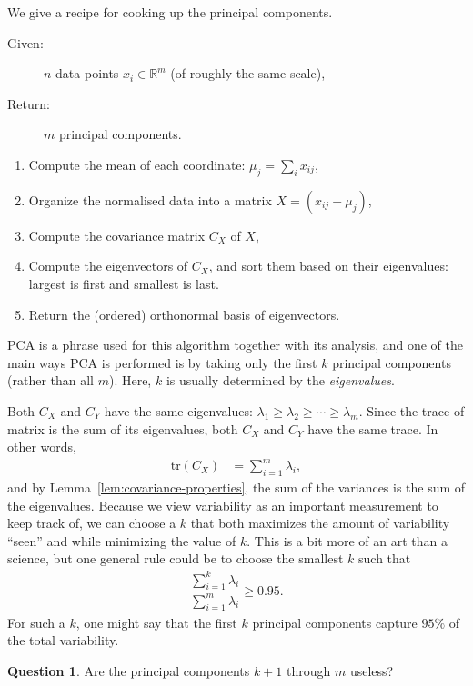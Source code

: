 \documentclass[a4paper, 12pt]{article}
\numberwithin{equation}{section}
\numberwithin{figure}{section}
\theoremstyle{definition}
\newtheorem{quest}[thm]{Question}
\renewcommand{\geq}{\geqslant}
\newcommand{\R}{\mathbb{R}}
\begin{document}
\medskip

We give a recipe for cooking up the principal components.
\begin{description}
	\item[Given:] $n$ data points $x_i\in\R^m$ (of roughly the same scale),
	\item[Return:] $m$ principal components.
\end{description}
\begin{enumerate}
	\item Compute the mean of each coordinate: $\mu_j = \sum_i x_{ij}$,
	\item Organize the normalised data into a matrix $X = (x_{ij} - \mu_j)$,
	\item Compute the covariance matrix $C_X$ of $X$,
	\item Compute the eigenvectors of $C_X$, and sort them based on their
	eigenvalues: largest is first and smallest is last.
	\item Return the (ordered) orthonormal basis of eigenvectors. 
\end{enumerate}

PCA is a phrase used for this algorithm together with its analysis, and one of
the main ways PCA is performed is by taking only the first $k$ principal
components (rather than all $m$). Here, $k$ is usually determined by the
\textit{eigenvalues}. 

Both $C_X$ and $C_Y$ have the same eigenvalues: $\lambda_1 \geq \lambda_2 \geq
\cdots \geq \lambda_m$. Since the trace of matrix is the sum of its eigenvalues,
both $C_X$ and $C_Y$ have the same trace. In other words, 
\begin{align*}
	\mathrm{tr}(C_X) &= \sum_{i=1}^m \lambda_i,
\end{align*}
and by Lemma~\ref{lem:covariance-properties}, the sum of the variances is the sum of
the eigenvalues. Because we view variability as an important measurement to keep
track of, we can choose a $k$ that both maximizes the amount of variability
``seen'' and while minimizing the value of $k$. This is a bit more of an art
than a science, but one general rule could be to choose the smallest $k$ such
that 
\begin{align} \label{eqn:k-rule}
	\dfrac{\sum_{i=1}^k\lambda_i}{\sum_{i=1}^m\lambda_i} \geq 0.95.
\end{align} 
For such a $k$, one might say that the first $k$ principal components capture
$95\%$ of the total variability.

\begin{quest}\label{quest:small-PC}
	Are the principal components $k+1$ through $m$ useless? 
\end{quest}
\end{document}

